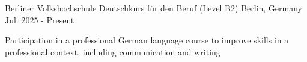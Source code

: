 

\begin{cventries}

  \cventry
    {Berliner Volkshochschule} %
    {Deutschkurs für den Beruf (Level B2)} %
    {Berlin, Germany} %
    {Jul. 2025 - Present} %
    {
      \begin{cvitems} %
        \item {Participation in a professional German language course to improve skills in a professional context, including communication and writing}
      \end{cvitems}
    }
    
\end{cventries}